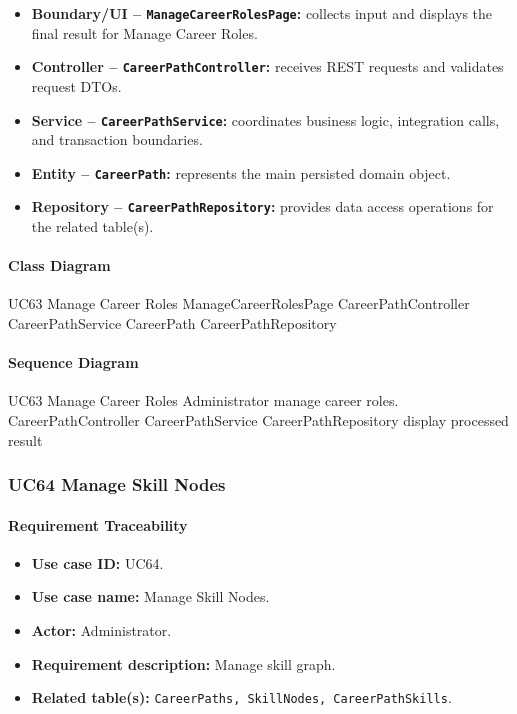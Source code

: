 \begin{itemize}
    \item \textbf{Boundary/UI -- \texttt{ManageCareerRolesPage}:} collects input and displays the final result for Manage Career Roles.
    \item \textbf{Controller -- \texttt{CareerPathController}:} receives REST requests and validates request DTOs.
    \item \textbf{Service -- \texttt{CareerPathService}:} coordinates business logic, integration calls, and transaction boundaries.
    \item \textbf{Entity -- \texttt{CareerPath}:} represents the main persisted domain object.
    \item \textbf{Repository -- \texttt{CareerPathRepository}:} provides data access operations for the related table(s).
\end{itemize}

\paragraph{Class Diagram}

\ClassDiagram
{UC63 Manage Career Roles}
{ManageCareerRolesPage}
{CareerPathController}
{CareerPathService}
{CareerPath}
{CareerPathRepository}

\paragraph{Sequence Diagram}

\SequenceDiagram
{UC63 Manage Career Roles}
{Administrator}
{manage career roles.}
{CareerPathController}
{CareerPathService}
{CareerPathRepository}
{display processed result}

\subsubsection{UC64 Manage Skill Nodes}

\paragraph{Requirement Traceability}

\begin{itemize}
    \item \textbf{Use case ID:} UC64.
    \item \textbf{Use case name:} Manage Skill Nodes.
    \item \textbf{Actor:} Administrator.
    \item \textbf{Requirement description:} Manage skill graph.
    \item \textbf{Related table(s):} \texttt{CareerPaths, SkillNodes, CareerPathSkills}.
\end{itemize}

